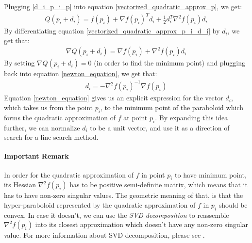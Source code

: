 Plugging \ref{d_i_p_i_p} into equation \ref{vectorized_quadratic_approx_p}, we get:
\begin{equation}\label{vectorized_quadratic_approx_p_i_d_i}
\begin{split}
Q\left(p_i + d_i\right) = f\left(p_i\right) + \nabla f\left(p_i\right)^Td_i + \frac{1}{2}d_i^T\nabla^2 f\left(p_i\right)d_i
\end{split}
\end{equation}
By differentiating equation \ref{vectorized_quadratic_approx_p_i_d_i} by $d_i$, we get that:
\begin{equation}\label{newton_equation}
\begin{split}
\nabla Q\left(p_i + d_i\right) = \nabla f\left(p_i\right) + \nabla^2 f\left(p_i\right)d_i
\end{split}
\end{equation}
By setting $\nabla Q\left(p_i + d_i\right) = 0$ (in order to find the minimum point) and plugging back into equation \ref{newton_equation}, we get that:
\begin{equation}\label{newton_equation}
\begin{split}
d_i = -\nabla^2 f\left(p_i\right)^{-1} \nabla f\left(p_i\right)
\end{split}
\end{equation}
Equation \ref{newton_equation} gives us an explicit expression for the vector $d_i$, which takes us from the point $p_i$, to the minimum point of the paraboloid which forms the quadratic approximation of $f$ at point $p_i$. By expanding this idea further, we can normalize $d_i$ to be a unit vector, and use it as a direction of search for a line-search method.
\paragraph{Important Remark} In order for the quadratic approximation of $f$ in point $p_i$ to have minimum point, its Hessian $\nabla^2 f\left(p_i\right)$ has to be positive semi-definite matrix, which means that it has to have non-zero singular values. The geometric meaning of that, is that the hyper-paraboloid represented by the quadratic approximation of $f$ in $p_i$ should be convex. In case it doesn't, we can use the \emph{SVD decomposition} to reassemble $\nabla^2 f\left(p_i\right)$ into its closest approximation which doesn't have any non-zero singular value. For more information about SVD decomposition, please see \cite{strang2006linear}.

